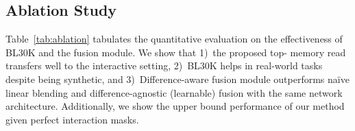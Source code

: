 \documentclass[final]{cvpr}
\begin{document}
	\subsection{Ablation Study}\label{ablation}
	
	Table~\ref{tab:ablation} tabulates the quantitative evaluation on the effectiveness of BL30K and the fusion module. We show that 1)\ the proposed top- memory read transfers well to the interactive setting, 2)\ BL30K helps in real-world tasks despite being synthetic, and 3)\ Difference-aware fusion module outperforms na\"ive linear blending and difference-agnostic (learnable) fusion with the same network architecture. 
	Additionally, we show the upper bound performance of our method given perfect interaction masks. 
	
	\setlength{\fboxrule}{1pt}
	\setlength{\fboxsep}{0pt}
\end{document}
